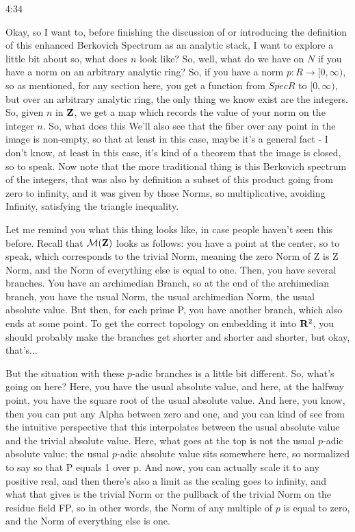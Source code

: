 \begin{unfinished}{4:34}
\begin{example}
\begin{example}
\begin{example}
Okay, so I want to, before finishing the discussion of or introducing the definition of this enhanced Berkovich Spectrum as an analytic stack, I want to explore a little bit about so, what does $n$ look like? So, well, what do we have on $N$ if you have a norm on an arbitrary analytic ring? So, if you have a norm $p: R \to [0, \infty)$, so as mentioned, for any section here, you get a function from $Spec R$ to $[0, \infty)$, but over an arbitrary analytic ring, the only thing we know exist are the integers. So, given $n$ in $\mathbf Z$, we get a map which records the value of your norm on the integer $n$. So, what does this
We'll also see that the fiber over any point in the image is non-empty, so that at least in this case, maybe it's a general fact - I don't know, at least in this case, it's kind of a theorem that the image is closed, so to speak. Now note that the more traditional thing is this Berkovich spectrum of the integers, that was also by definition a subset of this product going from zero to infinity, and it was given by those Norms, so multiplicative, avoiding Infinity, satisfying the triangle inequality.

Let me remind you what this thing looks like, in case people haven't seen this before. Recall that $\mathcal M(\mathbf Z)$ looks as follows: you have a point at the center, so to speak, which corresponds to the trivial Norm, meaning the zero Norm of Z is Z Norm, and the Norm of everything else is equal to one. Then, you have several branches. You have an archimedian Branch, so at the end of the archimedian branch, you have the usual Norm, the usual archimedian Norm, the usual absolute value. But then, for each prime P, you have another branch, which also ends at some point. To get the correct topology on embedding it into $\mathbf R^2$, you should probably make the branches get shorter and shorter and shorter, but okay, that's...

But the situation with these $p$-adic branches is a little bit different. So, what's going on here? Here, you have the usual absolute value, and here, at the halfway point, you have the square root of the usual absolute value. And here, you know, then you can put any Alpha between zero and one, and you can kind of see from the intuitive perspective that this interpolates between the usual absolute value and the trivial absolute value. Here, what goes at the top is not the usual $p$-adic absolute value; the usual $p$-adic absolute value sits somewhere here, so normalized to say so that P equals 1 over p. And now, you can actually scale it to any positive real, and then there's also a limit as the scaling goes to infinity, and what that gives is the trivial Norm or the pullback of the trivial Norm on the residue field FP, so in other words, the Norm of any multiple of $p$ is equal to zero, and the Norm of everything else is one.


\end{example}
\end{example}
\end{example}
\end{unfinished}
